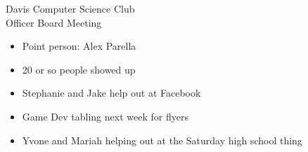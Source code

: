 \documentclass{article}
\begin{document}
\begin{Minutes}{Davis Computer Science Club\\Officer Board Meeting}

\begin {itemize}
\item Point person: Alex Parella
\item 20 or so people showed up
\end {itemize}

\begin {itemize}
\item Stephanie and Jake help out at Facebook
\item Game Dev tabling next week for flyers
\item Yvone and Mariah helping out at the Saturday high school thing
\end {itemize}
\end{Minutes}
\thispagestyle{creditfooter}
\end{document}
